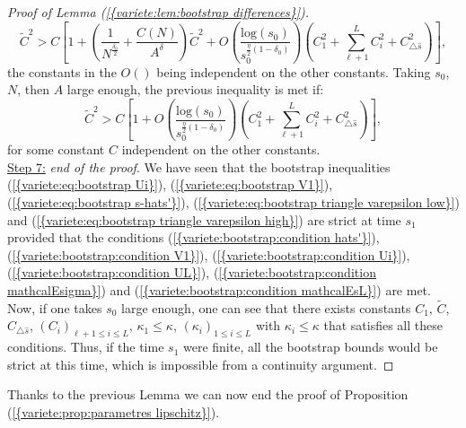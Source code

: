 \documentclass[11pt,a4paper,reqno]{amsart}
\theoremstyle{remark}
\numberwithin{equation}{section}
\begin{document}
\begin{proof}[Proof of Lemma {{\rm (\ref{{variete:lem:bootstrap differences}})}}]
$$ 
\tilde{C}^2>C\left[1+\left(\frac{1}{N^{\frac{\delta_0}{2}}}+\frac{C(N)}{A^{\delta}}\right)\tilde{C}^2 +O\left(\frac{\text{log}(s_0)}{s_0^{\frac{\eta}{2}(1-\delta_0)}}\right)(C_1^2+\sum_{\ell+1}^{L}C_i^2+C_{\triangle \hat{s}}^2)\right], 
$$
the constants in the $O()$ being independent on the other constants. Taking $s_0$, $N$, then $A$ large enough, the previous inequality is met if:
\begin{equation} \label{variete:bootstrap:condition mathcalEsL}
\tilde{C}^2> C\left[1+O\left(\frac{\text{log}(s_0)}{s_0^{\frac{\eta}{2}(1-\delta_0)}}\right)(C_1^2+\sum_{\ell+1}^{L}C_i^2+C_{\triangle \hat{s}}^2)\right], 
\end{equation}
for some constant $C$ independent on the other constants.\\
\underline{Step 7:} \emph{end of the proof}. We have seen that the bootstrap inequalities {{\rm (\ref{{variete:eq:bootstrap Ui}})}}, {{\rm (\ref{{variete:eq:bootstrap V1}})}}, {{\rm (\ref{{variete:eq:bootstrap s-hats'}})}}, {{\rm (\ref{{variete:eq:bootstrap triangle varepsilon low}})}} and {{\rm (\ref{{variete:eq:bootstrap triangle varepsilon high}})}} are strict at time $s_1$ provided that the conditions {{\rm (\ref{{variete:bootstrap:condition hats'}})}}, {{\rm (\ref{{variete:bootstrap:condition V1}})}}, {{\rm (\ref{{variete:bootstrap:condition Ui}})}}, {{\rm (\ref{{variete:bootstrap:condition UL}})}}, {{\rm (\ref{{variete:bootstrap:condition mathcalEsigma}})}} and {{\rm (\ref{{variete:bootstrap:condition mathcalEsL}})}} are met. Now, if one takes $s_0$ large enough, one can see that there exists constants $C_1$, $\tilde{C}$, $C_{\triangle \hat{s}}$, $(C_i)_{\ell+1\leq i \leq L}$, $\kappa_1\leq \kappa$, $(\kappa_i)_{1\leq i \leq L}$ with $\kappa_i\leq \kappa$ that satisfies all these conditions. Thus, if the time $s_1$ were finite, all the bootstrap bounds would be strict at this time, which is impossible from a continuity argument.
\end{proof}

Thanks to the previous Lemma we can now end the proof of Proposition {{\rm (\ref{{variete:prop:parametres lipschitz}})}}.
\end{document}
